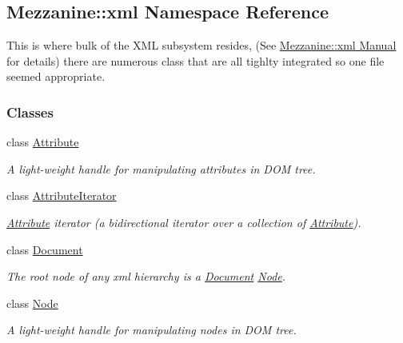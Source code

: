 \hypertarget{namespaceMezzanine_1_1xml}{
\subsection{Mezzanine::xml Namespace Reference}
\label{namespaceMezzanine_1_1xml}
}


This is where bulk of the XML subsystem resides, (See \hyperlink{XMLManual}{Mezzanine::xml Manual} for details) there are numerous class that are all tighlty integrated so one file seemed appropriate.  


\subsubsection*{Classes}
\begin{DoxyCompactItemize}
\item 
class \hyperlink{classMezzanine_1_1xml_1_1Attribute}{Attribute}
\begin{DoxyCompactList}\small\item\em A light-\/weight handle for manipulating attributes in DOM tree. \item\end{DoxyCompactList}\item 
class \hyperlink{classMezzanine_1_1xml_1_1AttributeIterator}{AttributeIterator}
\begin{DoxyCompactList}\small\item\em \hyperlink{classMezzanine_1_1xml_1_1Attribute}{Attribute} iterator (a bidirectional iterator over a collection of \hyperlink{classMezzanine_1_1xml_1_1Attribute}{Attribute}). \item\end{DoxyCompactList}\item 
class \hyperlink{classMezzanine_1_1xml_1_1Document}{Document}
\begin{DoxyCompactList}\small\item\em The root node of any xml hierarchy is a \hyperlink{classMezzanine_1_1xml_1_1Document}{Document} \hyperlink{classMezzanine_1_1xml_1_1Node}{Node}. \item\end{DoxyCompactList}\item 
class \hyperlink{classMezzanine_1_1xml_1_1Node}{Node}
\begin{DoxyCompactList}\small\item\em A light-\/weight handle for manipulating nodes in DOM tree. \item\end{DoxyCompactList}\item 

\end{DoxyCompactItemize}

